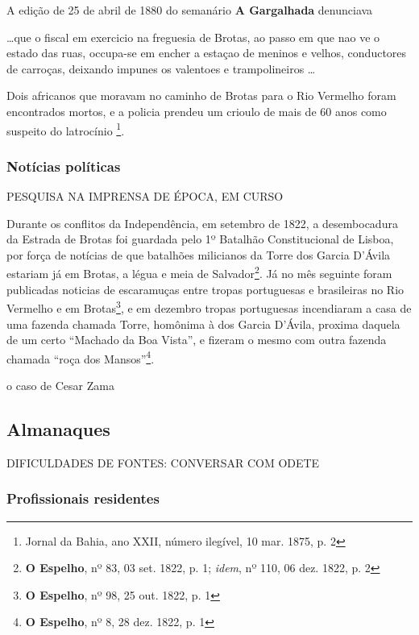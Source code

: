 A edição de 25 de abril de 1880 do semanário \textbf{A Gargalhada} denunciava

\begin{citacao}
\dots que o fiscal em exercicio na freguesia de Brotas, ao passo em que nao ve o estado das ruas, occupa-se em encher a estaçao de meninos e velhos, conductores de carroças, deixando impunes os valentoes e trampolineiros \dots
\end{citacao}

Dois africanos que moravam no caminho de Brotas para o Rio Vermelho foram encontrados mortos, e a policia prendeu um crioulo de mais de 60 anos como suspeito do latrocínio \footnote{Jornal da Bahia, ano XXII, número ilegível, 10 mar. 1875, p. 2}.

\subsubsection{Notícias políticas}\label{subsubsec:2.5.1.2}

PESQUISA NA IMPRENSA DE ÉPOCA, EM CURSO

Durante os conflitos da Independência, em setembro de 1822, a desembocadura da Estrada de Brotas foi guardada pelo 1º Batalhão Constitucional de Lisboa, por força de notícias de que batalhões milicianos da Torre dos Garcia D'Ávila estariam já em Brotas, a légua e meia de Salvador\footnote{\textbf{O Espelho}, nº 83, 03 set. 1822, p. 1; \textit{idem}, nº 110, 06 dez. 1822, p. 2}. Já no mês seguinte foram publicadas noticias de escaramuças entre tropas portuguesas e brasileiras no Rio Vermelho e em Brotas\footnote{\textbf{O Espelho}, nº 98, 25 out. 1822, p. 1}, e em dezembro tropas portuguesas incendiaram a casa de uma fazenda chamada Torre, homônima à dos Garcia D'Ávila, proxima daquela de um certo ``Machado da Boa Vista'', e fizeram o mesmo com outra fazenda chamada ``roça dos Mansos''\footnote{\textbf{O Espelho}, nº 8, 28 dez. 1822, p. 1}.

o caso de Cesar Zama

\subsection{Almanaques}\label{subsec:2.5.2}

DIFICULDADES DE FONTES: CONVERSAR COM ODETE

\subsubsection{Profissionais residentes}\label{subsubsec:2.5.2.1}

